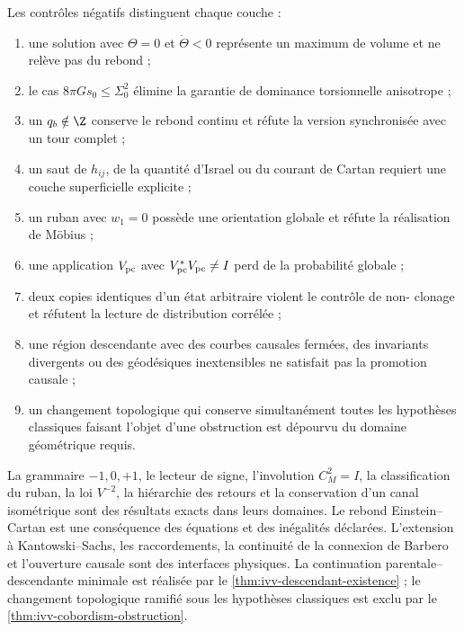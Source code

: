 Les contrôles négatifs distinguent chaque couche :
\begin{enumerate}
 \item une solution avec \(\Theta=0\) et \(\dot\Theta<0\) représente un
       maximum de volume et ne relève pas du rebond ;
 \item le cas \(8\pi Gs_0\leq\Sigma_0^2\) élimine la garantie de
       dominance torsionnelle anisotrope ;
 \item un \(q_b\notin\Z\) conserve le rebond continu et réfute la version
       synchronisée avec un tour complet ;
 \item un saut de \(h_{ij}\), de la quantité d'Israel ou du courant de
       Cartan requiert une couche superficielle explicite ;
 \item un ruban avec \(w_1=0\) possède une orientation globale et réfute la
       réalisation de Möbius ;
 \item une application \(V_{\rm pc}\) avec \(V_{\rm pc}^*V_{\rm pc}\ne I\) perd de la
       probabilité globale ;
 \item deux copies identiques d'un état arbitraire violent le contrôle de non-
       clonage et réfutent la lecture de distribution corrélée ;
 \item une région descendante avec des courbes causales fermées, des invariants
       divergents ou des géodésiques inextensibles ne satisfait pas la promotion causale ;
 \item un changement topologique qui conserve simultanément toutes les
       hypothèses classiques faisant l'objet d'une obstruction est dépourvu du domaine géométrique
       requis.
\end{enumerate}

\begin{proofstatusbox}
La grammaire \(-1,0,+1\), le lecteur de signe, l'involution
\(C_M^2=I\), la classification du ruban, la loi \(V^{-2}\), la hiérarchie
des retours et la conservation d'un canal isométrique sont des résultats
exacts dans leurs domaines. Le rebond Einstein--Cartan est une conséquence des
équations et des inégalités déclarées. L'extension à
Kantowski--Sachs, les raccordements, la continuité de la connexion de Barbero et
l'ouverture causale sont des interfaces physiques. La continuation
parentale--descendante minimale est réalisée par le
\cref{thm:ivv-descendant-existence} ; le changement topologique ramifié sous
les hypothèses classiques est exclu par le
\cref{thm:ivv-cobordism-obstruction}.
\end{proofstatusbox}

